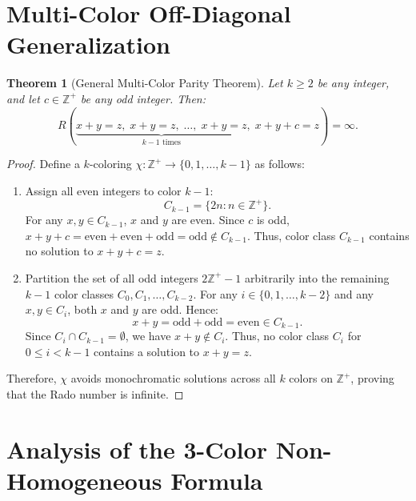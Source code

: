 \documentclass[11pt]{article}
\newtheorem{theorem}{Theorem}
\theoremstyle{definition}
\begin{document}
\section{Multi-Color Off-Diagonal Generalization}

\begin{theorem}[General Multi-Color Parity Theorem]\label{thm:multi_odd}
Let $k \ge 2$ be any integer, and let $c \in \mathbb{Z}^+$ be any odd integer. Then:
\begin{equation}
    R(\underbrace{x+y=z, \; x+y=z, \; \dots, \; x+y=z}_{k-1 \text{ times}}, \; x+y+c=z) = \infty.
\end{equation}
\end{theorem}

\begin{proof}
Define a $k$-coloring $\chi: \mathbb{Z}^+ \to \{0, 1, \dots, k-1\}$ as follows:
\begin{enumerate}
    \item Assign all even integers to color $k-1$:
    \begin{equation}
        C_{k-1} = \{2n : n \in \mathbb{Z}^+\}.
    \end{equation}
    For any $x, y \in C_{k-1}$, $x$ and $y$ are even. Since $c$ is odd, $x + y + c = \text{even} + \text{even} + \text{odd} = \text{odd} \notin C_{k-1}$. Thus, color class $C_{k-1}$ contains no solution to $x + y + c = z$.
    
    \item Partition the set of all odd integers $2\mathbb{Z}^+ - 1$ arbitrarily into the remaining $k-1$ color classes $C_0, C_1, \dots, C_{k-2}$. For any $i \in \{0, 1, \dots, k-2\}$ and any $x, y \in C_i$, both $x$ and $y$ are odd. Hence:
    \begin{equation}
        x + y = \text{odd} + \text{odd} = \text{even} \in C_{k-1}.
    \end{equation}
    Since $C_i \cap C_{k-1} = \emptyset$, we have $x + y \notin C_i$. Thus, no color class $C_i$ for $0 \le i < k-1$ contains a solution to $x + y = z$.
\end{enumerate}
Therefore, $\chi$ avoids monochromatic solutions across all $k$ colors on $\mathbb{Z}^+$, proving that the Rado number is infinite.
\end{proof}

\section{Analysis of the 3-Color Non-Homogeneous Formula}
\end{document}
